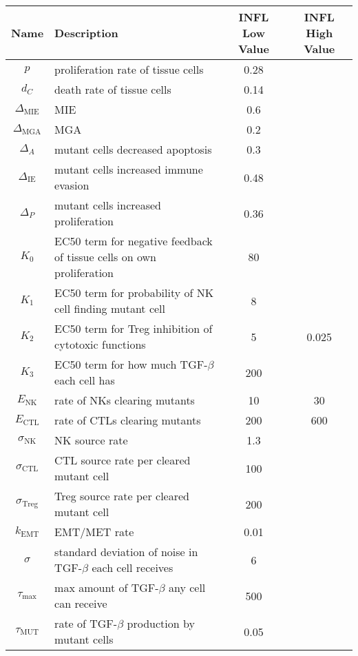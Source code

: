 \documentclass[11pt, a4paper, preprint]{article}
\begin{document}
\begin{table}[H]
\begin{center}
 \begin{tabular}{|| c | p{7cm} | c | c ||} 
 \hline
 Name & Description & INFL Low Value & INFL High Value  \\ [0.5ex] 
 \hline\hline
  $p$ & proliferation rate of tissue cells & 0.28 & \\ 
 \hline
 $d_C$  & death rate of tissue cells & 0.14 & \\
 \hline
$\Delta_\text{MIE}$ &  MIE & 0.6 & \\
 \hline
 $\Delta_\text{MGA}$ & MGA  & 0.2 &  \\
 \hline
  $\Delta_A$ & mutant cells decreased apoptosis & 0.3 &  \\
  \hline
  $\Delta_\text{IE}$ & mutant cells increased immune evasion & 0.48 &  \\
  \hline
  $\Delta_P$ & mutant cells increased proliferation & 0.36 &  \\
  \hline
 $K_0$ & EC50 term for negative feedback of tissue cells on own proliferation & 80 & \\
 \hline
 $K_1$ & EC50 term for probability of NK cell finding mutant cell & 8 & \\
 \hline
  $K_2$ & EC50 term for Treg inhibition of cytotoxic functions & 5 & 0.025  \\
  \hline
  $K_3$ & EC50 term for how much TGF-$\beta$ each cell has & 200 & \\
  \hline
 $E_\text{NK}$ & rate of NKs clearing mutants & 10 & 30  \\
  \hline
  $E_\text{CTL}$ & rate of CTLs clearing mutants & 200 & 600 \\
  \hline
  $\sigma_\text{NK}$ & NK source rate & 1.3 &  \\ 
  \hline
  $\sigma_\text{CTL}$ & CTL source rate per cleared mutant cell & 100 & \\ 
  \hline
  $\sigma_\text{Treg}$ & Treg source rate per cleared mutant cell & 200 & \\ 
  \hline
  $k_\text{EMT}$ & EMT/MET rate & 0.01 & \\
  \hline
  $\sigma$ & standard deviation of noise in TGF-$\beta$ each cell receives & 6 & \\
  \hline
 $\tau_\text{max}$ & max amount of TGF-$\beta$ any cell can receive & 500 &\\
  \hline 
 $\tau_\text{MUT}$ & rate of TGF-$\beta$ production by mutant cells & 0.05 & \\

\end{tabular}
\end{center}
\end{table}
\end{document}
